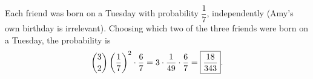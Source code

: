 Each friend was born on a Tuesday with probability $\dfrac{1}{7}$, independently (Amy's own birthday is irrelevant). Choosing which two of the three friends were born on a Tuesday, the probability is
\[\dbinom32\left(\dfrac{1}{7}\right)^2\cdot\dfrac{6}{7}=3\cdot\dfrac{1}{49}\cdot\dfrac{6}{7}=\boxed{\dfrac{18}{343}}.\]
